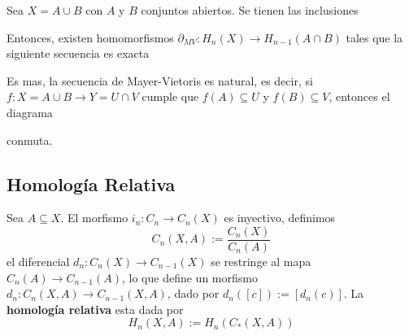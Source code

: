 \documentclass{article}
\begin{document}
\begin{teo}
    Sea $X=A\cup B$ con $A$ y $B$ conjuntos abiertos. Se tienen las inclusiones
    
    \vspace{2mm}
    \centerline{
    }
    \vspace{2mm}
    Entonces, existen homomorfismos $\partial_{MV}:H_{n}(X)\to H_{n-1}(A\cap B)$ tales que la 
    siguiente secuencia es exacta
    
    \vspace{2mm}
    \centerline{
        \xymatrixcolsep{3pc}
    }
    \vspace{2mm}
    Es mas, la secuencia de Mayer-Vietoris es natural, es decir, si $f:X=A\cup B\to Y=U\cap V$ 
    cumple que $f(A)\subseteq U$ y $f(B)\subseteq V$, entonces el diagrama
    
    \vspace{2mm}
    \centerline{
        \xymatrixcolsep{3pc}
    }
    conmuta.
\end{teo}

\subsection{Homología Relativa}
\begin{dfn}
    Sea $A\subseteq X$. El morfismo $i_{n}:C_{n}\to C_{n}(X)$ es inyectivo, definimos
    \begin{equation*}
        C_{n}(X,A):=\frac{C_{n}(X)}{C_{n}(A)}
    \end{equation*}
    el diferencial $d_{n}:C_{n}(X)\to C_{n-1}(X)$ se restringe al mapa $C_{n}(A)\to C_{n-1}(A)$,
    lo que define un morfismo $d_{n}:C_{n}(X,A)\to C_{n-1}(X,A)$, dado por 
    $d_{n}([c]):=[d_{n}(c)]$. La \textbf{homología relativa} esta dada por
    \begin{equation*}
        H_{n}(X,A):=H_{n}(C_{*}(X,A))
    \end{equation*}
\end{dfn}
\end{document}
